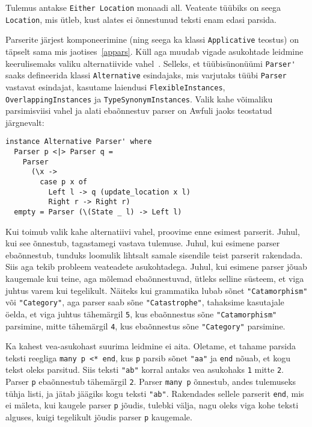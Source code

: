 \documentclass[12pt]{article}
\begin{document}
        Tulemus antakse \verb!Either Location! monaadi all. Veateate tüübiks on seega \verb!Location!, mis ütleb, kust alates ei õnnestunud teksti enam edasi parsida.

        Parserite järjest komponeerimine (ning seega ka klassi \verb!Applicative! teostus) on täpselt sama mis jaotises~\ref{appars}. Küll aga muudab vigade asukohtade leidmine keerulisemaks valiku alternatiivide vahel~\cite{Err}. Selleks, et tüübisünonüümi \verb!Parser'! saaks defineerida klassi \verb!Alternative! esindajaks, mis varjutaks tüübi \verb!Parser! vastavat esindajat, kasutame laiendusi \verb!FlexibleInstances!, \verb!OverlappingInstances! ja \verb!TypeSynonymInstances!. Valik kahe võimaliku parsimisviisi vahel ja alati ebaõnnestuv parser on Awfuli jaoks teostatud järgnevalt:

        \begin{verbatim}instance Alternative Parser' where
  Parser p <|> Parser q =
    Parser
      (\x ->
        case p x of
          Left l -> q (update_location x l)
          Right r -> Right r)
  empty = Parser (\(State _ l) -> Left l)\end{verbatim}

        Kui toimub valik kahe alternatiivi vahel, proovime enne esimest parserit. Juhul, kui see õnnestub, tagastamegi vastava tulemuse. Juhul, kui esimene parser ebaõnnestub, tunduks loomulik lihtsalt samale sisendile teist parserit rakendada. Siis aga tekib probleem veateadete asukohtadega. Juhul, kui esimene parser jõuab kaugemale kui teine, aga mõlemad ebaõnnestuvad, ütleks selline süsteem, et viga juhtus varem kui tegelikult. Näiteks kui grammatika lubab sõnet \verb!"Catamorphism"! või \verb!"Category"!, aga parser saab sõne \verb!"Catastrophe"!, tahaksime kasutajale öelda, et viga juhtus tähemärgil \verb!5!, kus ebaõnnestus sõne \verb!"Catamorphism"! parsimine, mitte tähemärgil \verb!4!, kus ebaõnnestus sõne \verb!"Category"! parsimine.

        Ka kahest vea-asukohast suurima leidmine ei aita. Oletame, et tahame parsida teksti reegliga \verb!many p <* end!, kus \verb!p! parsib sõnet \verb!"aa"! ja \verb!end! nõuab, et kogu tekst oleks parsitud. Siis teksti \verb!"ab"! korral antaks vea asukohaks \verb!1! mitte \verb!2!. Parser \verb!p! ebaõnnestub tähemärgil \verb!2!. Parser \verb!many p! õnnestub, andes tulemuseks tühja listi, ja jätab jäägiks kogu teksti \verb!"ab"!. Rakendades sellele parserit \verb!end!, mis ei mäleta, kui kaugele parser \verb!p! jõudis, tulebki välja, nagu oleks viga kohe teksti alguses, kuigi tegelikult jõudis parser \verb!p! kaugemale.
\end{document}
